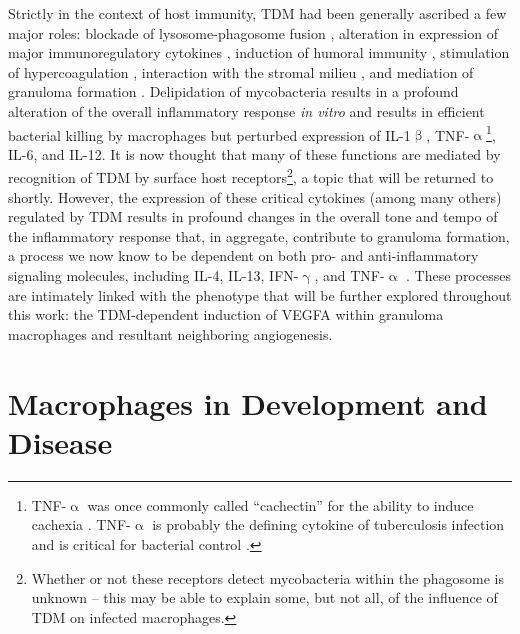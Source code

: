 Strictly in the context of host immunity, TDM had been generally ascribed a few major roles: blockade of lysosome\hyp{}phagosome fusion \citep{Indrigo2003, Patin2017b, Axelrod2008}, alteration in expression of major immunoregulatory cytokines \citep{Indrigo2002, Bowdish2009, Perez2000, Sakamoto2013}, induction of humoral immunity \citep{Ryll2001, Fujiwara1999, Fujita2005}, stimulation of hypercoagulation \citep{Donnachie2016, Retzinger1982, Retzinger1987}, interaction with the stromal milieu \citep{Sakamoto2010}, and mediation of granuloma formation \citep{Bekierkunst1968, Hunter2006b, Lee2012}. Delipidation of mycobacteria results in a profound alteration of the overall inflammatory response \textit{in vitro} and results in efficient bacterial killing by macrophages but perturbed expression of IL\hyp{}1$\upbeta$, TNF\hyp{}$\upalpha$\footnote{TNF\hyp{}$\upalpha$ was once commonly called ``cachectin'' for the ability to induce cachexia \citep{Tracey1988}. TNF\hyp{}$\upalpha$ is probably the defining cytokine of tuberculosis infection and is critical for bacterial control \citep{Orme1998}.}, IL\hyp{}6, and IL\hyp{}12. It is now thought that many of these functions are mediated by recognition of TDM by surface host receptors\footnote{Whether or not these receptors detect mycobacteria within the phagosome is unknown -- this may be able to explain some, but not all, of the influence of TDM on infected macrophages.}, a topic that will be returned to shortly. However, the expression of these critical cytokines (among many others) regulated by TDM results in profound changes in the overall tone and tempo of the inflammatory response that, in aggregate, contribute to granuloma formation, a process we now know to be dependent on both pro\hyp{} and anti\hyp{}inflammatory signaling molecules, including IL\hyp{}4, IL\hyp{}13, IFN\hyp{}$\upgamma$, and TNF\hyp{}$\upalpha$ \citep{Cronan2021, Cavalcanti2012, Flynn1993, Cooper1993, Kaneko1999, Bergeron1997, Akdis2011}. These processes are intimately linked with the phenotype that will be further explored throughout this work: the TDM\hyp{}dependent induction of VEGFA within granuloma macrophages and resultant neighboring angiogenesis.

\section{Macrophages in Development and Disease}\label{macrophages}


